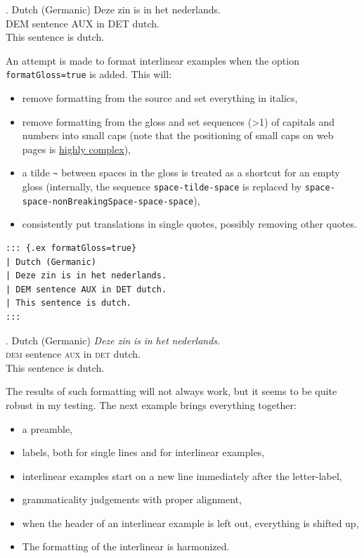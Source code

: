 \documentclass[
]{article}
\providecommand{\tightlist}{%
  \setlength{\itemsep}{0pt}\setlength{\parskip}{0pt}}
\begin{document}
\ex. \label{ling-ex:4.8} 
    Dutch (Germanic)
  \gll Deze zin is in het nederlands.\\
       DEM sentence AUX in DET dutch.\\
  \glt This sentence is dutch.

An attempt is made to format interlinear examples when the option
\texttt{formatGloss=true} is added. This will:

\begin{itemize}
\tightlist
\item
  remove formatting from the source and set everything in italics,
\item
  remove formatting from the gloss and set sequences (\textgreater1) of
  capitals and numbers into small caps (note that the positioning of
  small caps on web pages is
  \href{https://iamvdo.me/en/blog/css-font-metrics-line-height-and-vertical-align}{highly
  complex}),
\item
  a tilde \texttt{\textasciitilde{}} between spaces in the gloss is
  treated as a shortcut for an empty gloss (internally, the sequence
  \texttt{space-tilde-space} is replaced by
  \texttt{space-space-nonBreakingSpace-space-space}),
\item
  consistently put translations in single quotes, possibly removing
  other quotes.
\end{itemize}

\begin{verbatim}
::: {.ex formatGloss=true}
| Dutch (Germanic)
| Deze zin is in het nederlands.
| DEM sentence AUX in DET dutch.
| This sentence is dutch.
:::
\end{verbatim}

\ex. \label{ling-ex:4.9} 
    Dutch (Germanic)
  \gll \emph{Deze} \emph{zin} \emph{is} \emph{in} \emph{het}
\emph{nederlands.}\\
       \textsc{dem} sentence \textsc{aux} in \textsc{det} dutch.\\
  \glt This sentence is dutch.

The results of such formatting will not always work, but it seems to be
quite robust in my testing. The next example brings everything together:

\begin{itemize}
\tightlist
\item
  a preamble,
\item
  labels, both for single lines and for interlinear examples,
\item
  interlinear examples start on a new line immediately after the
  letter-label,
\item
  grammaticality judgements with proper alignment,
\item
  when the header of an interlinear example is left out, everything is
  shifted up,
\item
  The formatting of the interlinear is harmonized.
\end{itemize}
\end{document}
